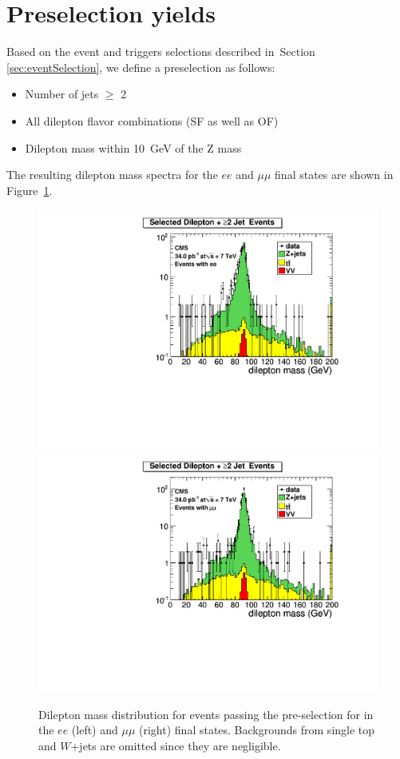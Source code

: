 \section{Preselection yields}
\label{sec:yields}

Based on the event and triggers selections described in~Section \ref{sec:eventSelection}, 
we define a preselection as follows:
\begin{itemize}
\item Number of jets $\geq$ 2
\item All dilepton flavor combinations (SF as well as OF)
\item Dilepton mass within 10~GeV of the Z mass
\end{itemize}
The resulting dilepton mass spectra for the $ee$ and $\mu\mu$ final states are shown in Figure~\ref{fig:dilmass}.


\begin{figure}[hbt]
\begin{center}
\includegraphics[width=0.48\linewidth]{plots/hdilmass_ee_allj.pdf}
\includegraphics[width=0.48\linewidth]{plots/hdilmass_mm_allj.pdf}
\caption{\label{fig:dilmass}\protect Dilepton mass distribution for events passing the pre-selection for \lumi
  in the $ee$ (left) and $\mu\mu$ (right) final states. Backgrounds from single top and $W$+jets are omitted
  since they are negligible.}
\end{center}
\end{figure}




